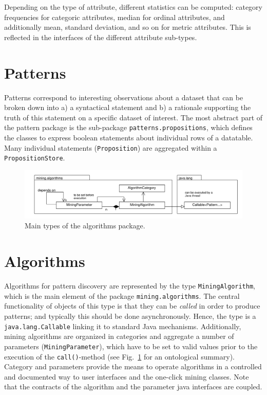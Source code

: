 \documentclass{scrartcl}
\newcommand{\class}[1]{\texttt{#1}}
\begin{document}
Depending on the type of attribute, different statistics can be computed:
category frequencies for categoric attributes, median for ordinal
attributes, and additionally mean, standard deviation, and so on for metric
attributes. This is reflected in the interfaces of the different attribute
sub-types.

\section{Patterns}
Patterns correspond to interesting observations about a dataset that can be
broken down into a) a syntactical statement and b) a rationale supporting the
truth of this statement on a specific dataset of interest. The most abstract
part of the pattern package is the sub-package \class{patterns.propositions}, which defines the classes to express
boolean statements about individual rows of a datatable. Many individual
statements (\class{Proposition}) are aggregated within a
\class{PropositionStore}.
\begin{figure}[ht]
\includegraphics[width=\columnwidth]{mining/algorithms_overview.pdf}
\caption{Main types of the algorithms package.}
\label{fig:alg_overview}
\end{figure}

\section{Algorithms}
Algorithms for pattern discovery are represented by the type
\class{MiningAlgorithm}, which is the main element of the package
\class{mining.algorithms}.
The central functionality of objects of this type is that they can be
\textit{called} in order to produce patterns; and typically this should be
done asynchronously.
Hence, the type is a \class{java.lang.Callable} linking it to standard Java mechanisms.
Additionally, mining algorithms are organized in categories and aggregate
a number of parameters (\class{MiningParameter}), which have to be set to valid values prior to the
execution of the \class{call()}-method (see Fig.~\ref{fig:alg_overview} for an
ontological summary).
Category and parameters provide the means to operate algorithms in a controlled
and documented way to user interfaces and the one-click mining classes.
Note that the contracts of the algorithm and the parameter
java interfaces are coupled.
\end{document}
